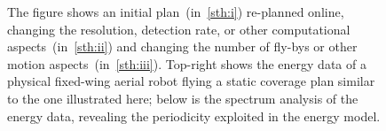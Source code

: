 \documentclass[letterpaper,10pt,journal,twoside]{IEEEtran}
\newcommand{\figpath}{./figures}
\theoremstyle{definition}
\begin{document}
\begin{figure}[t]
  \centering
  \vspace*{-9ex}
        {\color{blue}\scriptsize }
  \caption{%
  The figure shows an initial plan~(in~\ref{sth:i}) re-planned online, changing the resolution, detection rate, or other computational aspects~(in~\ref{sth:ii}) and changing the number of fly-bys or other motion aspects~(in~\ref{sth:iii}). 
  {\color{blue}Top-right} shows the energy data of a physical fixed-wing aerial robot flying a static coverage plan similar to the one illustrated here{\color{blue}; below is }%
  the spectrum analysis of the energy data, revealing the periodicity %
  exploited in the %
  energy model.
  }
  \label{fig:il-abs}
  \vspace*{-3.5ex}
\end{figure}
\end{document}
